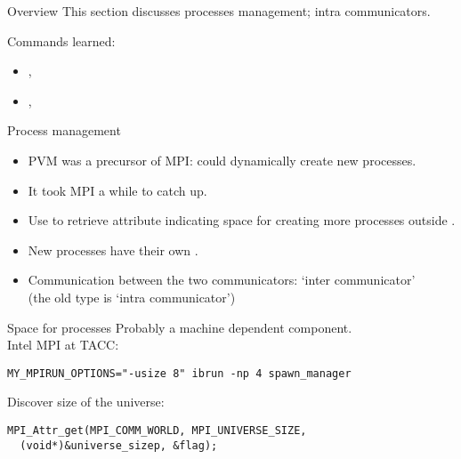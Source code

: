 
\begin{frame}[containsverbatim]{Overview}
  This section discusses processes management; intra communicators.

  Commands learned:
  \begin{itemize}
  \item {}, 
  \item {}, 
  \end{itemize}
\end{frame}

\begin{frame}[containsverbatim]{Process management}
  \begin{itemize}
  \item PVM was a precursor of MPI: could dynamically create new
    processes.
  \item It took MPI a while to catch up.
  \item Use  to retrieve
     attribute indicating space for
    creating more processes outside .
  \item New processes have their own .
  \item Communication between the two communicators: `inter
    communicator'\\ (the old type is `intra communicator')
  \end{itemize}
\end{frame}

\begin{frame}[containsverbatim]{Space for processes}
  Probably a machine dependent component.\\
  Intel MPI at TACC:
\begin{verbatim}
MY_MPIRUN_OPTIONS="-usize 8" ibrun -np 4 spawn_manager
\end{verbatim}
Discover size of the universe:
\begin{lstlisting}
MPI_Attr_get(MPI_COMM_WORLD, MPI_UNIVERSE_SIZE,
  (void*)&universe_sizep, &flag);
\end{lstlisting}
\end{frame}

